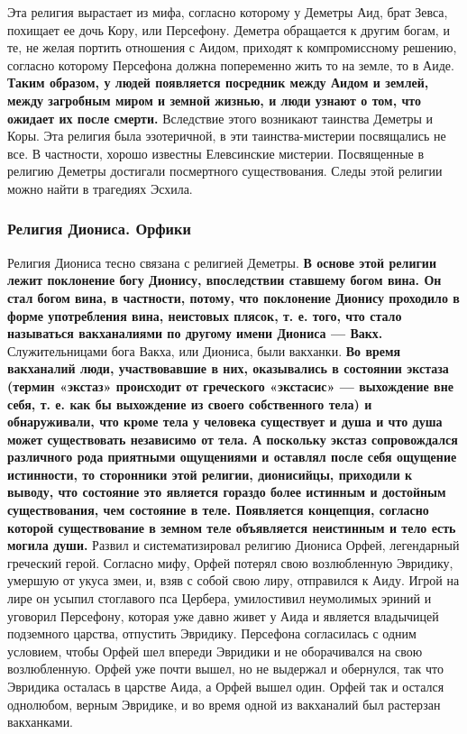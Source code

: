 	\par Эта религия вырастает из мифа, согласно которому у Деметры Аид, брат Зевса,
	похищает ее дочь Кору, или Персефону. Деметра обращается к другим богам, 
	и те, не желая портить отношения с Аидом, приходят к компромиссному решению, 
	согласно которому Персефона должна попеременно жить то на земле, то в Аиде. 
	\textbf{Таким образом, у людей появляется посредник между Аидом и землей, 
	между загробным миром и земной жизнью, и люди узнают о том, что 
	ожидает их после смерти.} Вследствие этого возникают таинства Деметры и Коры. 
	Эта религия была эзотеричной, в эти таинства-мистерии посвящались не все. 
	В частности, хорошо известны Елевсинские мистерии. 
	Посвященные в религию Деметры достигали посмертного существования. 
	Следы этой религии можно найти в трагедиях Эсхила.
	
	\subsubsection{Религия Диониса. Орфики}

	\par Религия Диониса тесно связана с религией Деметры. 
	\textbf{В основе этой религии лежит поклонение богу Дионису, впоследствии ставшему богом вина.
	Он стал богом вина, в частности, потому, что поклонение Дионису проходило в 
	форме употребления вина, неистовых плясок, т. е. того, что стало называться 
	вакханалиями по другому имени Диониса — Вакх.}
	Служительницами бога Вакха, или Диониса, были вакханки. 
	\textbf{Во время вакханалий люди, участвовавшие в них, оказывались в состоянии экстаза 
	(термин «экстаз» происходит от греческого «экстасис» — выхождение вне 
	себя, т. е. как бы выхождение из своего собственного тела) и обнаруживали, 
	что кроме тела у человека существует и душа и что душа может существовать 
	независимо от тела. А поскольку экстаз сопровождался различного рода 
	приятными ощущениями и оставлял после себя ощущение истинности, то сторонники 
	этой религии, дионисийцы, приходили к выводу, что состояние это является гораздо 
	более истинным и достойным существования, чем состояние в теле. Появляется концепция, 
	согласно которой существование в земном теле объявляется неистинным и тело есть 
	могила души.} Развил и систематизировал религию Диониса Орфей, 
	легендарный греческий герой. Согласно мифу, Орфей потерял свою возлюбленную 
	Эвридику, умершую от укуса змеи, и, взяв с собой свою лиру, отправился к Аиду. 
	Игрой на лире он усыпил стоглавого пса Цербера, умилостивил неумолимых 
	эриний и уговорил Персефону, которая уже давно живет у Аида и является 
	владычицей подземного царства, отпустить Эвридику. 
	Персефона согласилась с одним условием, чтобы Орфей 
	шел впереди Эвридики и не оборачивался на свою возлюбленную. 
	Орфей уже почти вышел, но не выдержал и обернулся, так что Эвридика 
	осталась в царстве Аида, а Орфей вышел один. 
	Орфей так и остался однолюбом, верным Эвридике, и во время одной из 
	вакханалий был растерзан вакханками.
    
